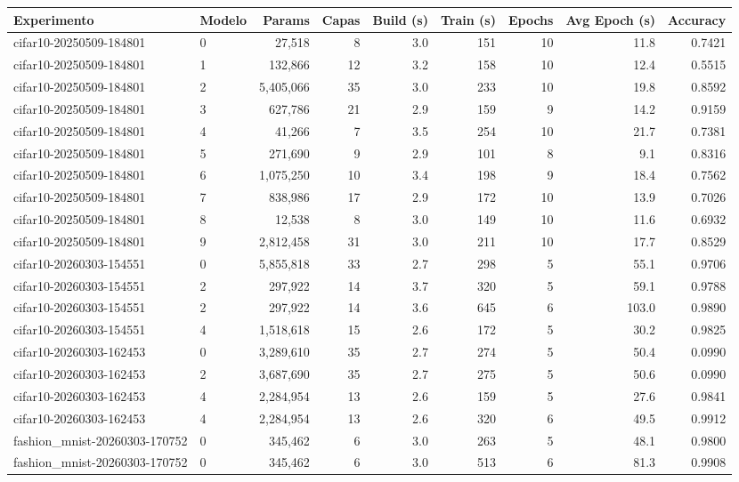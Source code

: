 \begin{tabular}{llrrrrrrr}
\toprule
Experimento & Modelo & Params & Capas & Build (s) & Train (s) & Epochs & Avg Epoch (s) & Accuracy \\
\midrule
cifar10-20250509-184801 & 0 & 27,518 & 8 & 3.0 & 151 & 10 & 11.8 & 0.7421 \\
cifar10-20250509-184801 & 1 & 132,866 & 12 & 3.2 & 158 & 10 & 12.4 & 0.5515 \\
cifar10-20250509-184801 & 2 & 5,405,066 & 35 & 3.0 & 233 & 10 & 19.8 & 0.8592 \\
cifar10-20250509-184801 & 3 & 627,786 & 21 & 2.9 & 159 & 9 & 14.2 & 0.9159 \\
cifar10-20250509-184801 & 4 & 41,266 & 7 & 3.5 & 254 & 10 & 21.7 & 0.7381 \\
cifar10-20250509-184801 & 5 & 271,690 & 9 & 2.9 & 101 & 8 & 9.1 & 0.8316 \\
cifar10-20250509-184801 & 6 & 1,075,250 & 10 & 3.4 & 198 & 9 & 18.4 & 0.7562 \\
cifar10-20250509-184801 & 7 & 838,986 & 17 & 2.9 & 172 & 10 & 13.9 & 0.7026 \\
cifar10-20250509-184801 & 8 & 12,538 & 8 & 3.0 & 149 & 10 & 11.6 & 0.6932 \\
cifar10-20250509-184801 & 9 & 2,812,458 & 31 & 3.0 & 211 & 10 & 17.7 & 0.8529 \\
cifar10-20260303-154551 & 0 & 5,855,818 & 33 & 2.7 & 298 & 5 & 55.1 & 0.9706 \\
cifar10-20260303-154551 & 2 & 297,922 & 14 & 3.7 & 320 & 5 & 59.1 & 0.9788 \\
cifar10-20260303-154551 & 2 & 297,922 & 14 & 3.6 & 645 & 6 & 103.0 & 0.9890 \\
cifar10-20260303-154551 & 4 & 1,518,618 & 15 & 2.6 & 172 & 5 & 30.2 & 0.9825 \\
cifar10-20260303-162453 & 0 & 3,289,610 & 35 & 2.7 & 274 & 5 & 50.4 & 0.0990 \\
cifar10-20260303-162453 & 2 & 3,687,690 & 35 & 2.7 & 275 & 5 & 50.6 & 0.0990 \\
cifar10-20260303-162453 & 4 & 2,284,954 & 13 & 2.6 & 159 & 5 & 27.6 & 0.9841 \\
cifar10-20260303-162453 & 4 & 2,284,954 & 13 & 2.6 & 320 & 6 & 49.5 & 0.9912 \\
fashion_mnist-20260303-170752 & 0 & 345,462 & 6 & 3.0 & 263 & 5 & 48.1 & 0.9800 \\
fashion_mnist-20260303-170752 & 0 & 345,462 & 6 & 3.0 & 513 & 6 & 81.3 & 0.9908 \\

\end{tabular}
